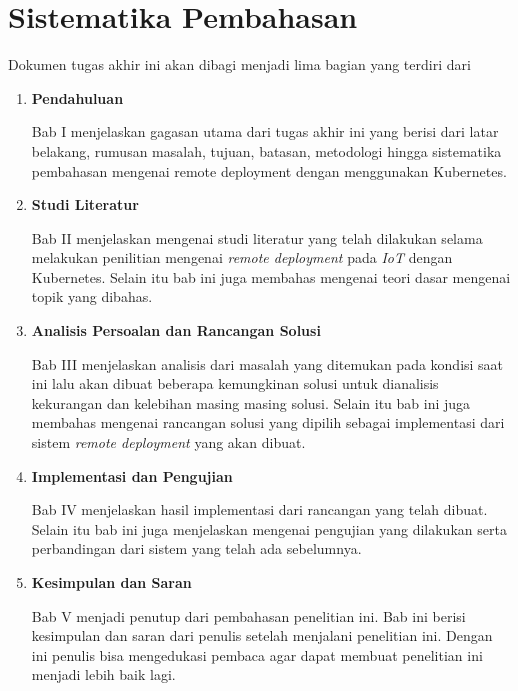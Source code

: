 \section{Sistematika Pembahasan}

Dokumen tugas akhir ini akan dibagi menjadi lima bagian yang terdiri dari

\begin{enumerate}
  \item \textbf{Pendahuluan}

        Bab I menjelaskan gagasan utama dari tugas akhir ini yang berisi dari latar belakang, rumusan masalah, tujuan, batasan, metodologi hingga sistematika pembahasan mengenai remote deployment dengan menggunakan Kubernetes.

  \item \textbf{Studi Literatur}

        Bab II menjelaskan mengenai studi literatur yang telah dilakukan selama melakukan penilitian mengenai \textit{remote deployment} pada \textit{IoT} dengan Kubernetes. Selain itu bab ini juga membahas mengenai teori dasar mengenai topik yang dibahas.

  \item \textbf{Analisis Persoalan dan Rancangan Solusi}

        Bab III menjelaskan analisis dari masalah yang ditemukan pada kondisi saat ini lalu akan dibuat beberapa kemungkinan solusi untuk dianalisis kekurangan dan kelebihan masing masing solusi. Selain itu bab ini juga membahas mengenai rancangan solusi yang dipilih sebagai implementasi dari sistem \textit{remote deployment} yang akan dibuat.

  \item \textbf{Implementasi dan Pengujian}


        Bab IV menjelaskan hasil implementasi dari rancangan yang telah dibuat. Selain itu bab ini juga menjelaskan mengenai pengujian yang dilakukan serta perbandingan dari sistem yang telah ada sebelumnya.

  \item \textbf{Kesimpulan dan Saran}


        Bab V menjadi penutup dari pembahasan penelitian ini. Bab ini berisi kesimpulan dan saran dari penulis setelah menjalani penelitian ini. Dengan ini penulis bisa mengedukasi pembaca agar dapat membuat penelitian ini menjadi lebih baik lagi.

\end{enumerate}